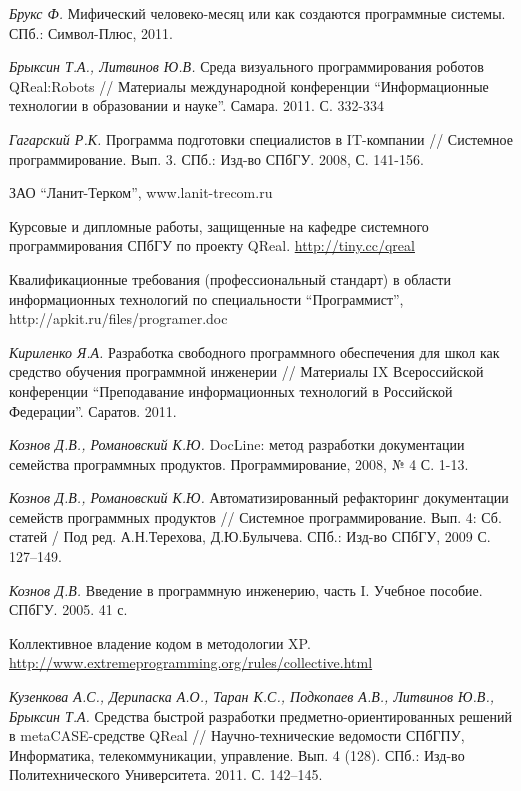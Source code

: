 \documentclass[a4paper]{article}
\begin{document}
\begin{thebibliography}{9001}

   \emph{Брукс Ф.} Мифический человеко-месяц или как создаются программные системы. СПб.: Символ-Плюс, 2011.
  
   \emph{Брыксин Т.А., Литвинов Ю.В.} Среда визуального программирования роботов QReal:Robots // Материалы международной конференции ``Информационные технологии в образовании и науке''. Самара. 2011. С. 332-334
  
   \emph{Гагарский Р.К.} Программа подготовки специалистов в IT-компании // Системное программирование. Вып. 3. СПб.: Изд-во СПбГУ. 2008, С. 141-156.
  
   ЗАО ``Ланит-Терком'', www.lanit-trecom.ru

   Курсовые и дипломные работы, защищенные на кафедре системного программирования СПбГУ по проекту QReal. \url{http://tiny.cc/qreal}

   Квалификационные требования (профессиональный стандарт) в области информационных технологий по специальности ``Программист'', http://apkit.ru/files/programer.doc
  
   \emph{Кириленко Я.А.} Разработка свободного программного обеспечения для школ как средство обучения программной инженерии // Материалы IX Всероссийской конференции ``Преподавание информационных технологий в Российской Федерации''. Саратов. 2011.
  
   \emph{Кознов Д.В., Романовский К.Ю.}  DocLine: метод разработки документации семейства программных продуктов. Программирование, 2008, № 4 С. 1-13.

   \emph{Кознов Д.В., Романовский К.Ю.} Автоматизированный рефакторинг документации семейств программных продуктов // Системное программирование. Вып. 4: Сб. статей / Под ред. А.Н.Терехова, Д.Ю.Булычева. СПб.: Изд-во СПбГУ, 2009 С. 127--149.
  
   \emph{Кознов Д.В.} Введение в программную инженерию, часть I. Учебное пособие. СПбГУ. 2005. 41 с. 

   Коллективное владение кодом в методологии XP. \url{http://www.extremeprogramming.org/rules/collective.html}
  
   \emph{Кузенкова А.С., Дерипаска А.О., Таран К.С., Подкопаев А.В., Литвинов Ю.В., Брыксин Т.А.} Средства быстрой разработки предметно-ориентированных решений в metaCASE-средстве QReal // Научно-технические ведомости СПбГПУ, Информатика, телекоммуникации, управление. Вып. 4 (128). СПб.: Изд-во Политехнического Университета. 2011. С. 142--145.


\end{thebibliography}
\end{document}
